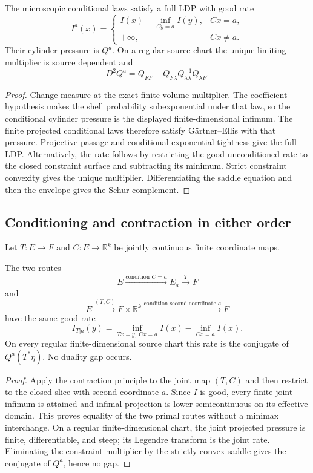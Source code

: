 \begin{theorem}
\label{thm:r6-d1-conditioning}
The microscopic conditional laws satisfy a full LDP with good rate
\[
I^a(x)=
\begin{cases}
I(x)-\inf_{Cy=a}I(y),&Cx=a,\\
+\infty,&Cx\ne a.
\end{cases}
\]
Their cylinder pressure is \(Q^a\).  On a regular source chart the unique
limiting multiplier is source dependent and
\[
D^2Q^a=
Q_{FF}-Q_{F\lambda}Q_{\lambda\lambda}^{-1}Q_{\lambda F}.
\]
\end{theorem}

\begin{proof}
Change measure at the exact finite-volume multiplier.  The coefficient
hypothesis makes the shell probability subexponential under that law, so the
conditional cylinder pressure is the displayed finite-dimensional infimum.
The finite projected conditional laws therefore satisfy Gärtner--Ellis with
that pressure.  Projective passage and conditional exponential tightness give
the full LDP.  Alternatively, the rate follows by restricting the good
unconditioned rate to the closed constraint surface and subtracting its
minimum.  Strict constraint convexity gives the unique multiplier.
Differentiating the saddle equation and then the envelope gives the Schur
complement.
\end{proof}

\subsection{Conditioning and contraction in either order}

Let \(T:E\to F\) and \(C:E\to\mathbb R^k\) be jointly continuous finite
coordinate maps.

\begin{theorem}
\label{thm:r6-d1-interchange}
The two routes
\[
E\xrightarrow{\text{condition }C=a}E_a\xrightarrow{T}F
\]
and
\[
E\xrightarrow{(T,C)}F\times\mathbb R^k
\xrightarrow{\text{condition second coordinate }a}F
\]
have the same good rate
\[
I_{T|a}(y)=
\inf_{Tx=y,\ Cx=a}I(x)-\inf_{Cx=a}I(x).
\]
On every regular finite-dimensional source chart this rate is the conjugate of
\(Q^a(T^*\eta)\).  No duality gap occurs.
\end{theorem}

\begin{proof}
Apply the contraction principle to the joint map \((T,C)\) and then restrict
to the closed slice with second coordinate \(a\).  Since \(I\) is good, every
finite joint infimum is attained and infimal projection is lower
semicontinuous on its effective domain.  This proves equality of the two
primal routes without a minimax interchange.  On a regular finite-dimensional
chart, the joint projected pressure is finite, differentiable, and steep; its
Legendre transform is the joint rate.  Eliminating the constraint multiplier
by the strictly convex saddle gives the conjugate of \(Q^a\), hence no gap.
\end{proof}


